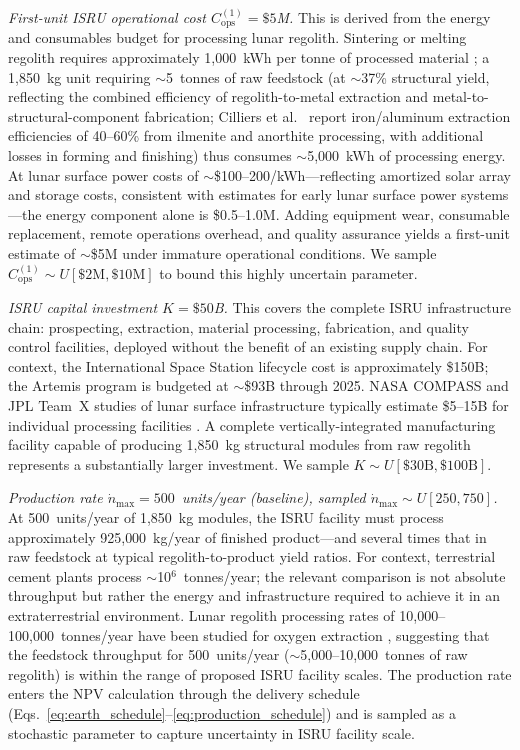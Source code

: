 \documentclass[preprint,12pt]{elsarticle}
\begin{document}
\emph{First-unit ISRU operational cost $C_{\mathrm{ops}}^{(1)} = \$5$M.} This is derived from the energy and consumables budget for processing lunar regolith. Sintering or melting regolith requires approximately 1{,}000~kWh per tonne of processed material \cite{cilliers2023}; a 1{,}850~kg unit requiring $\sim$5~tonnes of raw feedstock (at $\sim$37\% structural yield, reflecting the combined efficiency of regolith-to-metal extraction and metal-to-structural-component fabrication; Cilliers et al.\ \cite{cilliers2023} report iron/aluminum extraction efficiencies of 40--60\% from ilmenite and anorthite processing, with additional losses in forming and finishing) thus consumes $\sim$5{,}000~kWh of processing energy. At lunar surface power costs of $\sim$\$100--200/kWh---reflecting amortized solar array and storage costs, consistent with estimates for early lunar surface power systems \cite{sanders2015,lsic2021}---the energy component alone is \$0.5--1.0M. Adding equipment wear, consumable replacement, remote operations overhead, and quality assurance yields a first-unit estimate of $\sim$\$5M under immature operational conditions. We sample $C_{\mathrm{ops}}^{(1)} \sim U[\$2\text{M}, \$10\text{M}]$ to bound this highly uncertain parameter.

\emph{ISRU capital investment $K = \$50$B.} This covers the complete ISRU infrastructure chain: prospecting, extraction, material processing, fabrication, and quality control facilities, deployed without the benefit of an existing supply chain. For context, the International Space Station lifecycle cost is approximately \$150B; the Artemis program is budgeted at $\sim$\$93B through 2025. NASA COMPASS and JPL Team~X studies of lunar surface infrastructure typically estimate \$5--15B for individual processing facilities \cite{sanders2015,nasa2015handbook}. A complete vertically-integrated manufacturing facility capable of producing 1{,}850~kg structural modules from raw regolith represents a substantially larger investment. We sample $K \sim U[\$30\text{B}, \$100\text{B}]$.

\emph{Production rate $\dot{n}_{\max} = 500$~units/year (baseline), sampled $\dot{n}_{\max} \sim U[250, 750]$.} At 500~units/year of 1{,}850~kg modules, the ISRU facility must process approximately 925{,}000~kg/year of finished product---and several times that in raw feedstock at typical regolith-to-product yield ratios. For context, terrestrial cement plants process $\sim$10$^6$~tonnes/year; the relevant comparison is not absolute throughput but rather the energy and infrastructure required to achieve it in an extraterrestrial environment. Lunar regolith processing rates of 10{,}000--100{,}000~tonnes/year have been studied for oxygen extraction \cite{sanders2015}, suggesting that the feedstock throughput for 500~units/year ($\sim$5{,}000--10{,}000~tonnes of raw regolith) is within the range of proposed ISRU facility scales. The production rate enters the NPV calculation through the delivery schedule (Eqs.~\ref{eq:earth_schedule}--\ref{eq:production_schedule}) and is sampled as a stochastic parameter to capture uncertainty in ISRU facility scale.
\end{document}
